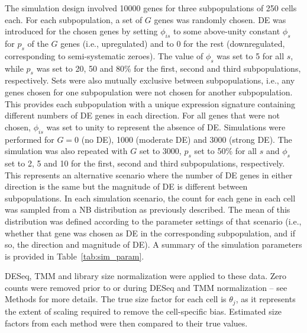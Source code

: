 \documentclass{bmcart}
\newcommand{\revised}[1]{#1}
\begin{document}
The simulation design involved 10000 genes for three subpopulations of 250 cells each.
For each subpopulation, a set of $G$ genes was randomly chosen.
DE was introduced for the chosen genes by setting $\phi_{is}$ to some above-unity constant $\phi_s$ for $p_s$ of the $G$ genes (i.e., upregulated) and to $0$ for the rest (downregulated, corresponding to semi-systematic zeroes).
The value of $\phi_s$ was set to 5 for all $s$, while $p_s$ was set to 20, 50 and 80\% for the first, second and third subpopulations, respectively.
Sets were also mutually exclusive between subpopulations, i.e., any genes chosen for one subpopulation were not chosen for another subpopulation.
This provides each subpopulation with a unique expression signature containing different numbers of DE genes in each direction.
For all genes that were not chosen, $\phi_{is}$ was set to unity to represent the absence of DE.
Simulations were performed for $G = 0$ (no DE), 1000 (moderate DE) and 3000 (strong DE).
The simulation was also repeated with $G$ set to 3000, $p_s$ set to 50\% for all $s$ and $\phi_{s}$ set to 2, 5 and 10 for the first, second and third subpopulations, respectively.
This represents an alternative scenario where the number of DE genes in either direction is the same but the magnitude of DE is different between subpopulations.
In each simulation scenario, the count for each gene in each cell was sampled from a NB distribution as previously described.
The mean of this distribution was defined according to the parameter settings of that scenario (i.e., whether that gene was chosen as DE in the corresponding subpopulation, and if so, the direction and magnitude of DE).
A summary of the simulation parameters is provided in Table~\ref{tab:sim_param}.    

DESeq, TMM and library size normalization were applied to \revised{these} data.
Zero counts were removed prior to or during DESeq and TMM normalization -- see Methods for more details.
The true size factor for each cell is $\theta_j$, as it represents the extent of scaling required to remove the cell-specific bias.
Estimated size factors from each method were then compared to their true values.
\end{document}
